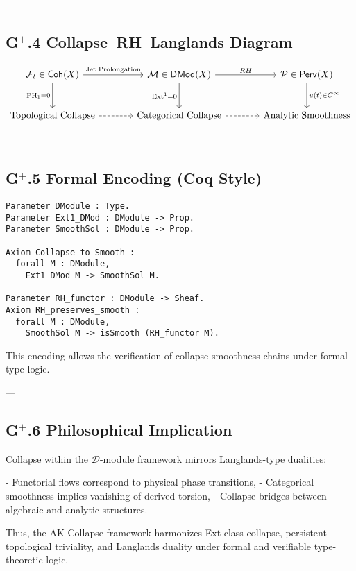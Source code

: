 \documentclass[11pt]{article}
\begin{document}
---

\subsection*{G$^+$.4 Collapse–RH–Langlands Diagram}

\[
\begin{tikzcd}[row sep=large, column sep=large]
\mathcal{F}_t \in \mathsf{Coh}(X) \arrow[r, "\text{Jet Prolongation}"] \arrow[d, "\mathrm{PH}_1 = 0"'] 
& \mathcal{M} \in \mathsf{DMod}(X) \arrow[r, "RH"] \arrow[d, "\mathrm{Ext}^1 = 0"'] 
& \mathcal{P} \in \mathsf{Perv}(X) \arrow[d, "u(t) \in C^\infty"] \\
\text{Topological Collapse} \arrow[r, dashed] 
& \text{Categorical Collapse} \arrow[r, dashed] 
& \text{Analytic Smoothness}
\end{tikzcd}
\]

---

\subsection*{G$^+$.5 Formal Encoding (Coq Style)}

\begin{lstlisting}[language=Coq]
Parameter DModule : Type.
Parameter Ext1_DMod : DModule -> Prop.
Parameter SmoothSol : DModule -> Prop.

Axiom Collapse_to_Smooth :
  forall M : DModule,
    Ext1_DMod M -> SmoothSol M.

Parameter RH_functor : DModule -> Sheaf.
Axiom RH_preserves_smooth :
  forall M : DModule,
    SmoothSol M -> isSmooth (RH_functor M).
\end{lstlisting}

This encoding allows the verification of collapse-smoothness chains under formal type logic.

---

\subsection*{G$^+$.6 Philosophical Implication}

Collapse within the $\mathcal{D}$-module framework mirrors Langlands-type dualities:

- Functorial flows correspond to physical phase transitions,
- Categorical smoothness implies vanishing of derived torsion,
- Collapse bridges between algebraic and analytic structures.

Thus, the AK Collapse framework harmonizes Ext-class collapse, persistent topological triviality, and Langlands duality  
under formal and verifiable type-theoretic logic.
\end{document}
